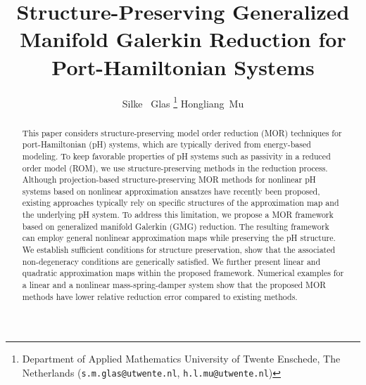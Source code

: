 \documentclass{article}
\title{Structure-Preserving Generalized Manifold Galerkin Reduction for Port-Hamiltonian Systems}
\date{}
\author{ 
	{%
		\Large Silke ~Glas \thanks{
			Department of Applied Mathematics
			University of Twente
			Enschede, The Netherlands
			(\texttt{s.m.glas@utwente.nl}, \texttt{h.l.mu@utwente.nl})}}
	\And
	{%
		\Large Hongliang~Mu \samethanks[1]} 
}
\newcommand{\pH}{\textsf{pH}\xspace}
\newcommand{\GMG}{\textsf{GMG}\xspace}
\newcommand{\ROM}{\textsf{ROM}\xspace}
\newcommand{\MOR}{\textsf{MOR}\xspace}
\begin{document}
	\maketitle
	
\begin{abstract}
		This paper considers structure-preserving model order reduction (\MOR) techniques for port-Hamiltonian (\pH) systems, which are typically derived from energy-based modeling.
		To keep favorable properties of \pH systems such as passivity in a reduced order model (\ROM), we use structure-preserving methods in the reduction process. 
		Although projection-based structure-preserving \MOR methods for nonlinear pH systems based on nonlinear approximation ansatzes have recently been proposed, existing approaches typically rely on specific structures of the approximation map and the underlying \pH system. 
		To address this limitation, we propose a \MOR framework based on generalized manifold Galerkin (\GMG) reduction. The resulting framework can employ general nonlinear approximation maps while preserving the \pH structure. We establish sufficient conditions for structure preservation, show that the associated non-degeneracy conditions are generically satisfied. 
		We further present linear and quadratic approximation maps within the proposed framework.
		Numerical examples for a linear and a nonlinear mass-spring-damper system show that the proposed \MOR methods have lower relative reduction error compared to existing methods. 
\end{abstract}
	
	
	
\end{document}
